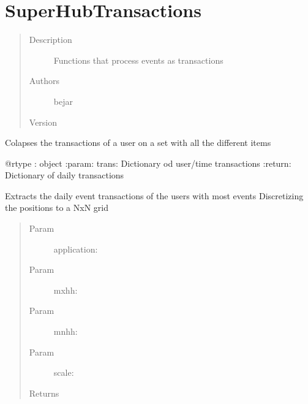 \documentclass[letterpaper,10pt,english]{sphinxmanual}
\begin{document}
\label{index:module-SuperHubTransactions}\label{index:module-SuperHubTransactions}

\chapter{SuperHubTransactions}
\label{index:superhubtransactions}\begin{quote}\begin{description}
\item[{Description}] \leavevmode
Functions that process events as transactions

\item[{Authors}] \leavevmode
bejar

\item[{Version}] 

\end{description}\end{quote}

\begin{fulllineitems}
\label{index:SuperHubTransactions.colapseUserDailyTransactions}
Colapses the transactions of a user on a set with all the different items

@rtype : object
:param: trans: Dictionary od user/time transactions
:return: Dictionary of daily transactions

\end{fulllineitems}


\begin{fulllineitems}
\label{index:SuperHubTransactions.dailyDiscretizedTransactions}
Extracts the daily event transactions of the users with most events
Discretizing the positions to a NxN grid
\begin{quote}\begin{description}
\item[{Param }] \leavevmode
application:

\item[{Param }] \leavevmode
mxhh:

\item[{Param }] \leavevmode
mnhh:

\item[{Param }] \leavevmode
scale:

\item[{Returns}] \leavevmode


\end{description}\end{quote}

\end{fulllineitems}
\end{document}

